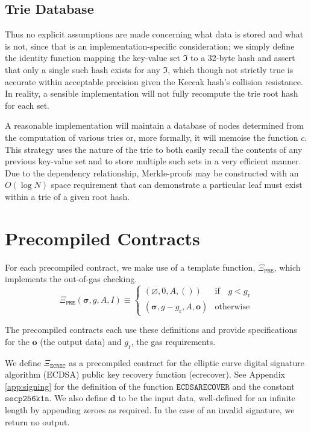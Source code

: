 \documentclass[9pt,oneside]{amsart}
\begin{document}
\subsection{Trie Database}
Thus no explicit assumptions are made concerning what data is stored and what is not, since that is an implementation-specific consideration; we simply define the identity function mapping the key-value set $\mathfrak{I}$ to a 32-byte hash and assert that only a single such hash exists for any $\mathfrak{I}$, which though not strictly true is accurate within acceptable precision given the Keccak hash's collision resistance. In reality, a sensible implementation will not fully recompute the trie root hash for each set.

A reasonable implementation will maintain a database of nodes determined from the computation of various tries or, more formally, it will memoise the function $c$. This strategy uses the nature of the trie to both easily recall the contents of any previous key-value set and to store multiple such sets in a very efficient manner. Due to the dependency relationship, Merkle-proofs may be constructed with an $O(\log N)$ space requirement that can demonstrate a particular leaf must exist within a trie of a given root hash.

\section{Precompiled Contracts}\label{app:precompiled}

For each precompiled contract, we make use of a template function, $\Xi_{\mathtt{PRE}}$, which implements the out-of-gas checking.
\begin{equation} \label{eq:pre}
\Xi_{\mathtt{PRE}}(\boldsymbol{\sigma}, g, A, I) \equiv \begin{cases}
(\varnothing, 0, A, ()) & \text{if} \quad g < g_{\mathrm{r}} \\
(\boldsymbol\sigma, g - g_{\mathrm{r}}, A, \mathbf{o}) & \text{otherwise}\end{cases}
\end{equation}

The precompiled contracts each use these definitions and provide specifications for the $\mathbf{o}$ (the output data) and $g_{\mathrm{r}}$, the gas requirements.

We define $\Xi_{\mathtt{ECREC}}$ as a precompiled contract for the elliptic curve digital signature algorithm (ECDSA) public key recovery function (ecrecover).
See Appendix \ref{app:signing} for the definition of the function $\mathtt{ECDSARECOVER}$ and the constant $\mathtt{secp256k1n}$.
We also define $\mathbf{d}$ to be the input data, well-defined for an infinite length by appending zeroes as required.
In the case of an invalid signature, we return no output.
\end{document}
